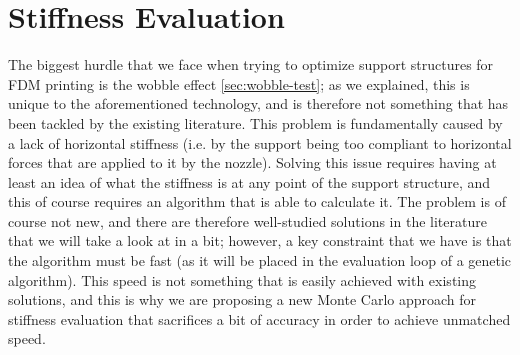 \chapter{Stiffness Evaluation}
\label{cha:stiffness_algo}

The biggest hurdle that we face when trying to optimize support structures for FDM printing is the
wobble effect \ref{sec:wobble-test}; as we explained, this is unique to the aforementioned
technology, and is therefore not something that has been tackled by the existing literature.
This problem is fundamentally caused by a lack of horizontal stiffness (i.e. by the support being too compliant
to horizontal forces that are applied to it by the nozzle).
Solving this issue requires having at least an idea of what the stiffness is at any point of the support structure,
and this of course requires an algorithm that is able to calculate it.
The problem is of course not new, and there are therefore well-studied solutions in the literature that we will take a look at
in a bit; however, a key constraint that we have is that the algorithm must be fast (as it will be placed in the
evaluation loop of a genetic algorithm). This speed is not something that is easily achieved with existing solutions,
and this is why we are proposing a new Monte Carlo approach for stiffness evaluation that sacrifices a bit of accuracy
in order to achieve unmatched speed.

